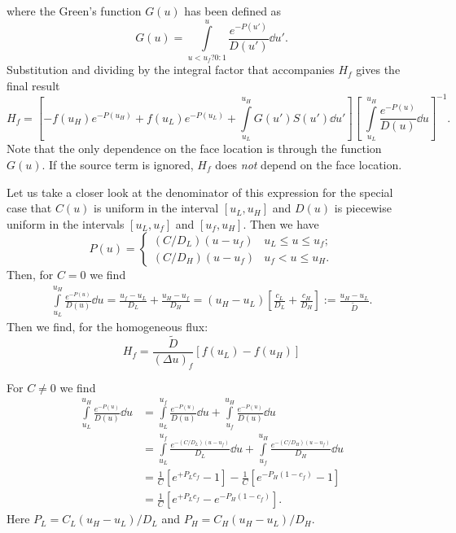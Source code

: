 \documentclass{book}
\begin{document}
where the Green's function $G(u)$ has been defined as
\begin{equation}
	G(u) = \int\limits_{u<u_f?0 : 1}^{u} \frac{e^{-P(u')}}{D(u')} \dd{u'}.
\end{equation}
Substitution and dividing by the integral factor that accompanies $H_f$ gives the final result
\begin{equation}
	H_f
	=
	\left[
	- f(u_H)e^{-P(u_H)}
	+ f(u_L)e^{-P(u_L)}
	+ \int\limits_{u_L}^{u_H} G(u')S(u') \dd{u'}
	\right]
	\left[\;
		\int\limits_{u_L}^{u_H} \frac{e^{-P(u)}}{D(u)} \dd{u}
	\right]^{-1}.
\end{equation}
Note that the only dependence on the face location is through the function $G(u)$.
If the source term is ignored, $H_f$ does {\em not} depend on the face location.

Let us take a closer look at the denominator of this expression for the
special case that $C(u)$ is uniform in the interval $[u_L,u_H]$ and $D(u)$
is piecewise uniform in the intervals $[u_L,u_f]$ and $[u_f,u_H]$. Then we have
\begin{equation}
	P(u) = \begin{cases}
		(C/D_L)(u-u_f)	& u_L \leq u \leq u_f; \\
		(C/D_H)(u-u_f)	& u_f < u \leq u_H.
	\end{cases}
\end{equation}
Then, for $C=0$ we find
\begin{align}
	   \int\limits_{u_L}^{u_H} \frac{e^{-P(u)}}{D(u)} \dd{u}
	   = \frac{u_f-u_L}{D_L} + \frac{u_H-u_f}{D_H}
	   = (u_H-u_L)\left[\frac{c_L}{D_L} + \frac{c_H}{D_H}\right]
	   := \frac{u_H-u_L}{\tilde{D}}.
\end{align}
Then we find, for the homogeneous flux:
\begin{equation}
	H_f = \frac{\tilde{D}}{(\Delta u)_f}\left[
		 f(u_L)
		-f(u_H)
	\right]
\end{equation}

For $C\neq0$ we find
\begin{align}
	   \int\limits_{u_L}^{u_H} \frac{e^{-P(u)}}{D(u)} \dd{u}
	&= \int\limits_{u_L}^{u_f} \frac{e^{-P(u)}}{D(u)} \dd{u}
	 + \int\limits_{u_f}^{u_H} \frac{e^{-P(u)}}{D(u)} \dd{u}
	\nonumber \\
	&= \int\limits_{u_L}^{u_f} \frac{e^{-(C/D_L)(u-u_f)}}{D_L} \dd{u}
	 + \int\limits_{u_f}^{u_H} \frac{e^{-(C/D_H)(u-u_f)}}{D_H} \dd{u}
	\nonumber \\
	&= \frac{1}{C}\left[e^{+P_Lc_f} - 1 \right]
	 - \frac{1}{C}\left[e^{-P_H(1-c_f)} - 1 \right]
	\nonumber \\
	&= \frac{1}{C}\left[e^{+P_Lc_f} - e^{-P_H(1-c_f)} \right].
\end{align}
Here $P_L = C_L(u_H-u_L)/D_L$ and $P_H = C_H(u_H-u_L)/D_H$.
\end{document}
